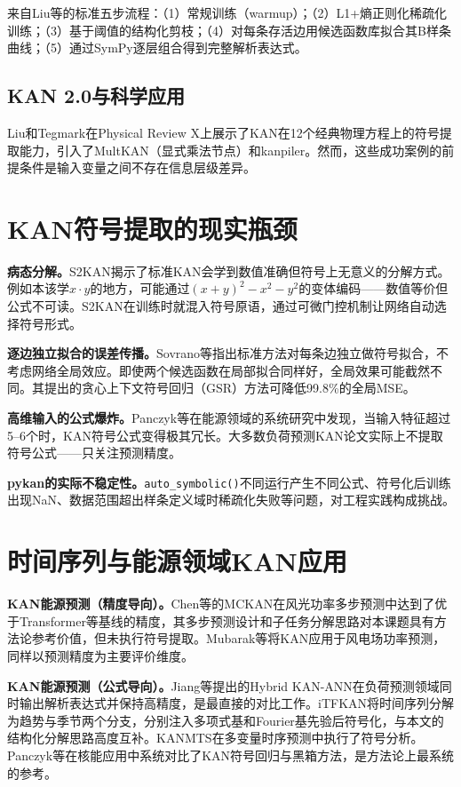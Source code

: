 \documentclass[12pt,a4paper,oneside]{ctexbook}
\begin{document}
来自Liu等\cite{liu2025kan,liu2025kan2}的标准五步流程：（1）常规训练（warmup）；（2）L1+熵正则化稀疏化训练；（3）基于阈值的结构化剪枝；（4）对每条存活边用候选函数库拟合其B样条曲线；（5）通过SymPy逐层组合得到完整解析表达式。

\subsection{KAN 2.0与科学应用}

Liu和Tegmark\cite{liu2025kan2}在Physical Review X上展示了KAN在12个经典物理方程上的符号提取能力，引入了MultKAN（显式乘法节点）和kanpiler。然而，这些成功案例的前提条件是输入变量之间不存在信息层级差异。

\section{KAN符号提取的现实瓶颈}

\textbf{病态分解。}S2KAN\cite{bagrow2025s2kan}揭示了标准KAN会学到数值准确但符号上无意义的分解方式。例如本该学$x \cdot y$的地方，可能通过$(x+y)^2 - x^2 - y^2$的变体编码——数值等价但公式不可读。S2KAN在训练时就混入符号原语，通过可微门控机制让网络自动选择符号形式。

\textbf{逐边独立拟合的误差传播。}Sovrano等\cite{sovrano2026incontext}指出标准方法对每条边独立做符号拟合，不考虑网络全局效应。即使两个候选函数在局部拟合同样好，全局效果可能截然不同。其提出的贪心上下文符号回归（GSR）方法可降低99.8\%的全局MSE。

\textbf{高维输入的公式爆炸。}Panczyk等\cite{panczyk2025opening}在能源领域的系统研究中发现，当输入特征超过5--6个时，KAN符号公式变得极其冗长。大多数负荷预测KAN论文实际上不提取符号公式——只关注预测精度。

\textbf{pykan的实际不稳定性。}\texttt{auto\_symbolic()}不同运行产生不同公式、符号化后训练出现NaN、数据范围超出样条定义域时稀疏化失败等问题，对工程实践构成挑战。

\section{时间序列与能源领域KAN应用}

\textbf{KAN能源预测（精度导向）。}Chen等\cite{chen2025mckan}的MCKAN在风光功率多步预测中达到了优于Transformer等基线的精度，其多步预测设计和子任务分解思路对本课题具有方法论参考价值，但未执行符号提取。Mubarak等\cite{mubarak2024kan}将KAN应用于风电场功率预测，同样以预测精度为主要评价维度。

\textbf{KAN能源预测（公式导向）。}Jiang等\cite{jiang2024kanann}提出的Hybrid KAN-ANN在负荷预测领域同时输出解析表达式并保持高精度，是最直接的对比工作。iTFKAN\cite{itfkan2025}将时间序列分解为趋势与季节两个分支，分别注入多项式基和Fourier基先验后符号化，与本文的结构化分解思路高度互补。KANMTS\cite{kanmts2025}在多变量时序预测中执行了符号分析。Panczyk等\cite{panczyk2025opening}在核能应用中系统对比了KAN符号回归与黑箱方法，是方法论上最系统的参考。
\end{document}
